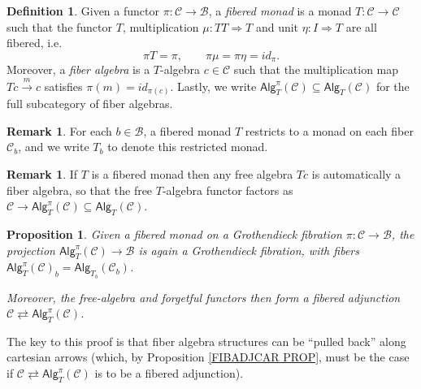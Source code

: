 \documentclass[a4paper,10pt
,draft
]{article}%
\numberwithin{equation}{section}
\numberwithin{figure}{section}
\newtheorem{proposition}[equation]{Proposition}%
\theoremstyle{definition} %
\newtheorem{definition}[equation]{Definition}%
\newtheorem{remark}[equation]{Remark}%
\newcommand{\1}{\ensuremath{\mathbbm 1}}%
\begin{document}
\begin{definition}\label{FIBMON DEF}
	Given a functor $\pi \colon \mathcal{C} \to \mathcal{B}$,
	a \textit{fibered monad} is a monad $T \colon \mathcal{C} \to \mathcal{C}$ such that 
	the functor $T$,
	multiplication 
	$\mu \colon TT \Rightarrow T$
	and unit $\eta \colon I \Rightarrow T$
	are all fibered, i.e.
	\[
	\pi T = \pi,\qquad
	\pi\mu=\pi\eta=id_{\pi}.
	\]
	Moreover, a \textit{fiber algebra} is a $T$-algebra $c \in \mathcal{C}$
	such that the multiplication map
	$Tc \xrightarrow{m} c$ satisfies 
	$\pi(m)=id_{\pi(c)}$.
	Lastly, we write $\mathsf{Alg}^{\pi}_T(\mathcal{C}) \subseteq \mathsf{Alg}_T(\mathcal{C})$ for the full subcategory of fiber algebras.
\end{definition}


\begin{remark}
        \label{MONFIB_REM}
	For each $b\in \mathcal{B}$, a fibered monad $T$ restricts to a monad on each fiber $\mathcal{C}_b$, and we write $T_b$ to denote this restricted monad.
\end{remark}


\begin{remark}
	If $T$ is a fibered monad then any free algebra $Tc$ is automatically a fiber algebra, so that the free $T$-algebra functor factors
	as 
	$\mathcal{C} \to \mathsf{Alg}^{\pi}_T(\mathcal{C}) \subseteq \mathsf{Alg}_T(\mathcal{C})$.
\end{remark}



\begin{proposition}\label{FIBALGGR PROP}
	Given a fibered monad on a Grothendieck fibration $\pi \colon \mathcal{C} \to \mathcal{B}$,
	the projection $\mathsf{Alg}^{\pi}_T(\mathcal{C}) \to \mathcal{B}$
	is again a Grothendieck fibration, with fibers
        $\mathsf{Alg}^{\pi}_T(\mathcal C)_b = \mathsf{Alg}_{T_b}(\mathcal C_b)$.
	
	Moreover, the free-algebra and forgetful functors then form a fibered adjunction
	$\mathcal{C} \rightleftarrows \mathsf{Alg}^{\pi}_T(\mathcal{C})$.
\end{proposition}


The key to this proof is that fiber algebra structures can be ``pulled back'' along cartesian arrows
(which, by Proposition \ref{FIBADJCAR PROP}, must be the case if $\mathcal{C} \rightleftarrows \mathsf{Alg}^{\pi}_T(\mathcal{C})$ is to be a fibered adjunction). 
\end{document}
